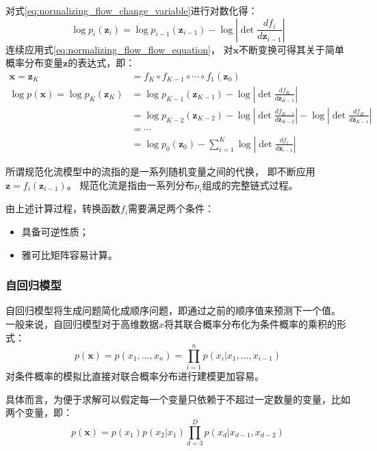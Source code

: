 对式{\ref{eq:normalizing_flow_change_variable}}进行对数化得：
\begin{equation}
    \label{eq:normalizing_flow_flow_equation}
    \log p_i(\bm{z}_i)=\log p_{i-1}(\bm{z}_{i-1})-\log \left\rvert \det \frac{df_{i}}{d\bm{z}_{i-1}}   \right\rvert
\end{equation}
连续应用式{\ref{eq:normalizing_flow_flow_equation}}，
对{$\bm{x}$}不断变换可得其关于简单概率分布变量{$\bm{z}$}的表达式，即：
\begin{align}
    \bm{x}=\bm{z}_K 
    & =f_K\circ f_{K-1} \circ \cdots  \circ f_1(\bm{z}_0) \\
    \log p(\bm{x})= \log p_K(\bm{z}_K)
    & =\log p_{K-1}(\bm{z}_{K-1}) - \log \left| \det \frac{df_K}{d\bm{z}_{K-1}} \right| \\
    & =\log p_{K-2}(\bm{z}_{K-2}) - \log \left| \det \frac{df_{K-1}}{d\bm{z}_{K-2}} \right| - \log \left| \det \frac{df_K}{d\bm{z}_{K-1}} \right| \\
    & = \cdots \\
    & = \log p_0(\bm{z}_0) - \sum_{i=1}^{K} \log \left| \det \frac{df_i}{d\bm{z}_{i-1}}\right|
\end{align}

所谓规范化流模型中的流指的是一系列随机变量之间的代换，
即不断应用{$\bm{z}=f_i(\bm{z}_{i-1})$}。
规范化流是指由一系列分布{$p_i$}组成的完整链式过程{ {\cite{weng2018flow}}}。

由上述计算过程，转换函数{$f_i$}需要满足两个条件：
\begin{itemize}
    \item 具备可逆性质；
    \item 雅可比矩阵容易计算。
\end{itemize}

\subsubsection{自回归模型}

自回归模型将生成问题简化成顺序问题，即通过之前的顺序值来预测下一个值。
一般来说，自回归模型对于高维数据{$x$}将其联合概率分布化为条件概率的乘积的形式：
\begin{equation}
    \label{eq:autoregressive_model_defination}
    p(\bm{x})=p(x_1,\ldots ,x_n)=\prod_{i=1}^{n}p(x_i|x_1,\ldots ,x_{i-1})
\end{equation}
对条件概率的模拟比直接对联合概率分布进行建模更加容易。

具体而言，为便于求解可以假定每一个变量只依赖于不超过一定数量的变量，比如两个变量，即：
\begin{equation}
    p(\bm{x})=p(x_1)p(x_2|x_1)\prod_{d=3}^{D}p(x_d \vert x_{d-1},x_{d-2})
\end{equation}

